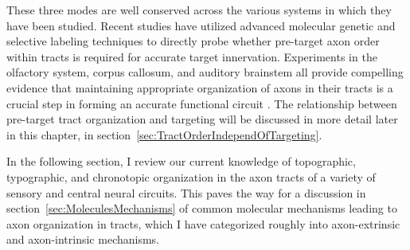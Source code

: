 These three modes are well conserved across the various systems in which they have been studied.
Recent studies have utilized advanced molecular genetic and selective labeling techniques to directly probe whether pre-target axon order within tracts is required for accurate target innervation.
Experiments in the olfactory system, corpus callosum, and auditory brainstem all provide compelling evidence that maintaining appropriate organization of axons in their tracts is a crucial step in forming an accurate functional circuit \cite{imai2009pre,zhou2013axon,michalski2013robo3}.
The relationship between pre-target tract organization and targeting will be discussed in more detail later in this chapter, in section~\ref{sec:TractOrderIndependOfTargeting}.

In the following section, I review our current knowledge of topographic, typographic, and chronotopic organization in the axon tracts of a variety of sensory and central neural circuits.
This paves the way for a discussion in section~\ref{sec:MoleculesMechanisms} of common molecular mechanisms leading to axon organization in tracts, which I have categorized roughly into axon-extrinsic and axon-intrinsic mechanisms.